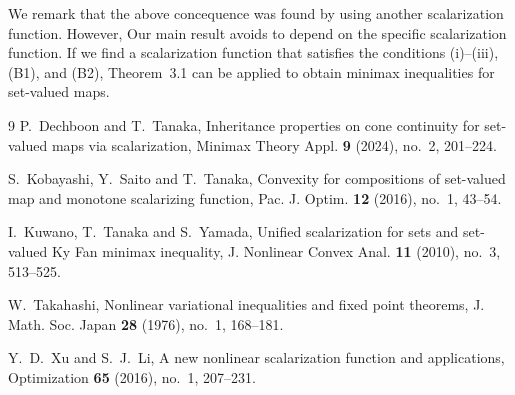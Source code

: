 \documentclass[a4paper,11pt]{jsarticle}
\theoremstyle{definition}
\begin{document}
We remark that the above concequence was found by using another scalarization function. However,
Our main result avoids to depend on the specific scalarization function.
If we find a scalarization function that satisfies the conditions (i)--(iii), (B1), and (B2),
Theorem~3.1 can be applied to obtain minimax inequalities for set-valued maps.

\begin{thebibliography}{9}
  P.~Dechboon and T.~Tanaka,
  Inheritance properties on cone continuity for set-valued maps via
  scalarization, Minimax Theory Appl. {\bf 9} (2024), no.~2, 201--224.

  S.~Kobayashi, Y.~Saito and T.~Tanaka,
  Convexity for compositions of set-valued map and
  monotone scalarizing function, Pac. J. Optim. {\bf 12} (2016), no.~1, 43--54.

  I.~Kuwano, T.~Tanaka and S.~Yamada,
  Unified scalarization for sets and set-valued Ky Fan minimax inequality,
  J. Nonlinear Convex Anal. {\bf 11} (2010), no.~3, 513--525.

  W.~Takahashi,
  Nonlinear variational inequalities and fixed point theorems,
  J. Math. Soc. Japan {\bf 28} (1976), no.~1, 168--181.

  Y.~D.~Xu and S.~J.~Li,
  A new nonlinear scalarization function and applications,
  Optimization {\bf 65} (2016), no.~1, 207--231.
\end{thebibliography}
\end{document}
